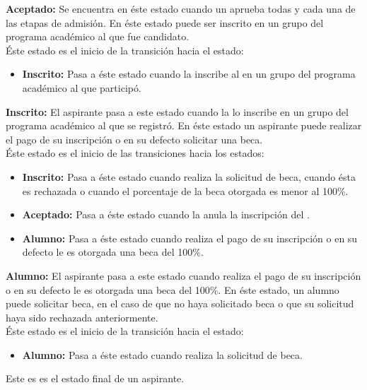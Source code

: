 \noindent \textbf{Aceptado:} Se encuentra en éste estado cuando un  aprueba todas y cada una de las etapas de admisión. En éste estado puede ser inscrito en un grupo del programa académico al que fue candidato.\\

Éste estado es el inicio de la transición hacia el estado:
\begin{itemize}
	\item \textbf{Inscrito:} Pasa a éste estado cuando la  inscribe al  en un grupo del programa académico al que participó.	
\end{itemize}

\noindent \textbf{Inscrito:} El aspirante pasa a este estado cuando la  lo inscribe en un grupo del programa académico al que se registró. En éste estado un aspirante puede realizar el pago de su inscripción o en su defecto solicitar una beca. \\

Éste estado es el inicio de las transiciones hacia los estados:
\begin{itemize}
	\item \textbf{Inscrito:} Pasa a éste estado cuando realiza la solicitud de beca, cuando ésta es rechazada o cuando el porcentaje de la beca otorgada es menor al 100\%.
	\item \textbf{Aceptado:} Pasa a éste estado cuando la  anula la inscripción del .
	\item \textbf{Alumno:} Pasa a éste estado cuando realiza el pago de su inscripción o en su defecto le es otorgada una beca del 100\%.	
\end{itemize}

\noindent \textbf{Alumno:} El aspirante pasa a este estado cuando realiza el pago de su inscripción o en su defecto le es otorgada una beca del 100\%. En éste estado, un alumno puede solicitar beca, en el caso de que no haya solicitado beca o que su solicitud haya sido rechazada anteriormente.\\

Éste estado es el inicio de la transición hacia el estado:
\begin{itemize}
	\item \textbf{Alumno:} Pasa a éste estado cuando realiza la solicitud de beca.	
\end{itemize}

Este es es el estado final de un aspirante.
